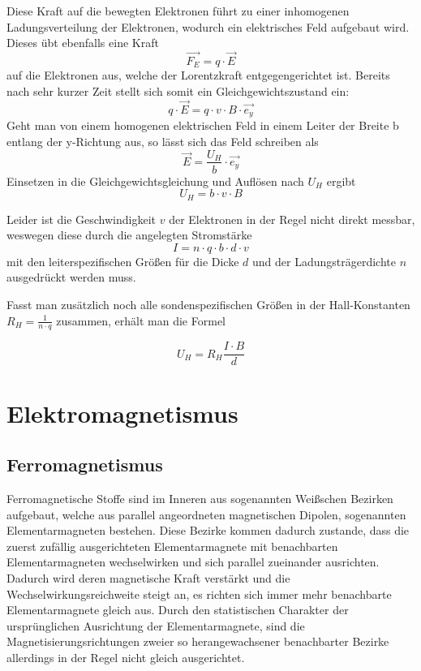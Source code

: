 \documentclass[bigchapter,colorback,accentcolor=tud4b,linedtoc,11pt]{tudreport}
\begin{document}
Diese Kraft auf die bewegten Elektronen führt zu einer inhomogenen Ladungsverteilung der Elektronen, wodurch ein elektrisches Feld aufgebaut wird. Dieses übt ebenfalls eine Kraft 
$$\vec{F_E}=q \cdot \vec{E}$$
auf die Elektronen aus, welche der Lorentzkraft entgegengerichtet ist. Bereits nach sehr kurzer Zeit stellt sich somit ein Gleichgewichtszustand ein:
$$q \cdot \vec{E} = q \cdot v  \cdot B \cdot \vec{e_y}$$
Geht man von einem homogenen elektrischen Feld in einem Leiter der Breite b entlang der y-Richtung aus, so lässt sich das Feld schreiben als 
$$\vec{E} = \frac{U_H}{b}\cdot \vec{e_y}$$
Einsetzen in die Gleichgewichtsgleichung und Auflösen nach $U_H$ ergibt
$$U_H = b \cdot v \cdot B$$

Leider ist die Geschwindigkeit $v$ der Elektronen in der Regel nicht direkt messbar, weswegen diese durch die angelegten Stromstärke 
$$I= n\cdot q \cdot b \cdot d \cdot v$$
mit den leiterspezifischen Größen für die Dicke $d$ und der Ladungsträgerdichte $n$ ausgedrückt werden muss.

Fasst man zusätzlich noch alle sondenspezifischen Größen in der Hall-Konstanten $R_H = \frac{1}{n\cdot q}$ zusammen, erhält man die Formel

$$U_H = R_H \frac{I\cdot B}{d}$$

\section{Elektromagnetismus}
\subsection{Ferromagnetismus}

Ferromagnetische Stoffe sind im Inneren aus sogenannten Weißschen Bezirken aufgebaut, welche aus parallel angeordneten magnetischen Dipolen, sogenannten Elementarmagneten bestehen.
Diese Bezirke kommen dadurch zustande, dass die zuerst zufällig ausgerichteten Elementarmagnete mit benachbarten Elementarmagneten wechselwirken und sich parallel zueinander ausrichten. Dadurch wird deren magnetische Kraft verstärkt und die Wechselwirkungsreichweite steigt an, es richten sich immer mehr benachbarte Elementarmagnete gleich aus. Durch den statistischen Charakter der ursprünglichen Ausrichtung der Elementarmagnete, sind die Magnetisierungsrichtungen zweier so herangewachsener benachbarter Bezirke allerdings in der Regel nicht gleich ausgerichtet.
\end{document}
